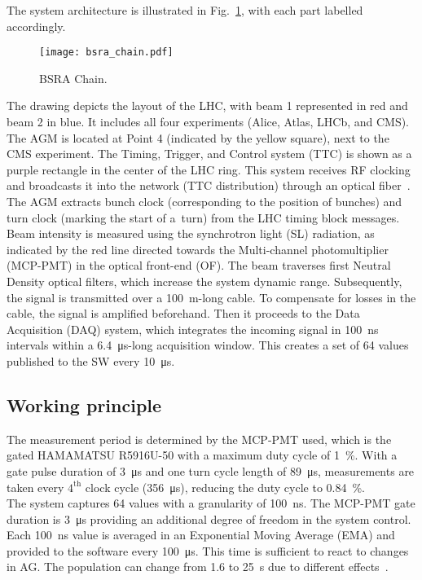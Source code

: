 The system architecture is illustrated in
Fig.~\ref{fig:bsra_chain}, with each part labelled accordingly.
\begin{figure}[!tbh]
    \centering
    \texttt{[image: bsra\_chain.pdf]}
    \caption{BSRA Chain.}
    \label{fig:bsra_chain}
\end{figure} 
The drawing depicts the layout of the LHC, with beam 1 represented
in red and beam 2 in blue. It includes all four experiments (Alice, Atlas,
LHCb, and CMS). The AGM is located at Point 4 (indicated by the yellow
square), next to the CMS experiment. The Timing, Trigger, and Control system
(TTC) is shown as a purple rectangle in the center of the LHC ring. This system
receives RF clocking and broadcasts it into the network (TTC
distribution) through an optical fiber~\cite{ttc_distribution}. The AGM extracts bunch clock 
(corresponding to the position of bunches) and turn clock (marking
the start of a~turn) from the LHC timing block messages.\\
Beam intensity is measured using the synchrotron light (SL) radiation, as indicated by the red line directed towards the Multi-channel photomultiplier
(MCP-PMT) in the optical front-end (OF). The beam traverses first Neutral Density optical filters, which increase the system dynamic range. Subsequently, the signal is
transmitted over a \SI{100}{m}-long cable. To compensate for losses in the cable,
the signal is amplified beforehand. Then it proceeds to the Data Acquisition
(DAQ) system, which integrates the incoming signal in \SI{100}{\nano\second} intervals within a \SI{6.4}{\micro\second}-long acquisition window. This creates a set of 64 values published to
the SW every \SI{10}{\micro\second}.

\subsection{Working principle}
The measurement period is determined by the MCP-PMT used, which is the gated
HAMAMATSU R5916U-50 with a maximum duty cycle of \SI{1}{\%}. With a gate pulse duration
of \SI{3}{\micro\second} and one turn cycle length of \SI{89}{\micro\second},
measurements are taken every $4^{\text{th}}$ clock cycle (\SI{356}{\micro\second}),
reducing the duty cycle to \SI{0.84}{\%}.\\
The system captures 64 values with a granularity of \SI{100}{\nano\second}. The
MCP-PMT gate duration is \SI{3}{\micro\second} providing an additional degree of
freedom in the system control. Each \SI{100}{\nano\second} value is averaged in an
 Exponential Moving Average (EMA) and provided to the software every \SI{100}{\micro\second}. This
time is sufficient to react to changes in AG. The population can change from
1.6 to \SI{25}{\second} due to different
effects~\cite{high_sensitivity_measurement}.

